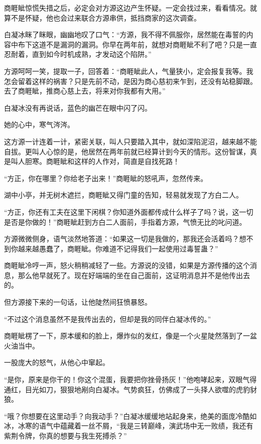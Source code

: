 \begin{this_body}
商睚眦惊慌失措之后，必定会对方源这边产生怀疑。一定会找过来，看看情况。就算不是怀疑，他也会过来联合方源串供，抵挡商家的这次调查。

白凝冰眯了眯眼，幽幽地叹了口气：“方源，我不得不佩服你，居然能在毒誓的内容中布下这道不是漏洞的漏洞。你早在两年前，就想对商睚眦不利了吧？只是一直忍耐着，直到如今时机成熟，才发动这个陷阱。”

方源呵呵一笑，提取一子，回答着：“商睚眦此人，气量狭小，定会报复我等。我怎会留着这样的祸害？只是先前不动，是因为商心慈初来乍到，还没有站稳脚跟。去了商睚眦，推商心慈上去，将来对你我都有大用。”

白凝冰没有再说话，蓝色的幽芒在眼中闪了闪。

她的心中，寒气涔涔。

这方源一计连着一计，紧密关联，叫人只要踏入其中，就如深陷泥沼，越来越不能自拔。更叫人心惊的是，他居然在两年前就已经算计到今天的情形。这份智谋，真是叫人胆寒。商睚眦和这样的人作对，简直是自找死路！

“方正，你在哪里？你给老子出来！”商睚眦的怒吼声，忽然传来。

湖中小亭，并无树木遮拦，商睚眦又得门童的告知，轻易就发现了方白二人。

“方正，你还有工夫在这里下闲棋？你知道外面都传成什么样子了吗？说，这一切是否是你做的！”商睚眦赶到方白二人面前，手指着方源，气愤无比的叱问道。

方源微微侧身，语气淡然地答道：“如果这一切是我做的，那我还会活着吗？想不到你越来越愚蠢了，商睚眦。你难道不记得我们一起使用过毒誓蛊？”

商睚眦冷哼一声，怒火稍稍减轻了一些。方源说的没错，如果是方源传播的这个消息，那么他早就死了。现在好端端的坐在自己面前，这证明消息并不是他传出去的。

但方源接下来的一句话，让他陡然间狂愤暴怒。

“不过这个消息虽然不是我传出去的，但却是我的同伴白凝冰传的。”

商睚眦楞了一下，原本缓和的脸上，爆炸似的发红，像是一个火星陡然落到了一盆火油当中。

一股庞大的怒气，从他心中窜起。

“是你，原来是你干的！你这个混蛋，我要把你挫骨扬灰！”他咆哮起来，双眼气得通红，目光如刀，狠狠地剐向白凝冰。气势疯狂，仿佛成了一头择人欲噬的虎豹豺狼。

“哦？你想要在这里动手？向我动手？”白凝冰缓缓地站起身来，绝美的面庞冷酷如冰，冰寒的语气中蕴藏着一丝不屑，“我是三转巅峰，演武场中无一败绩，我还有紫荆令牌，你真的想要与我生死搏杀？”


\end{this_body}
